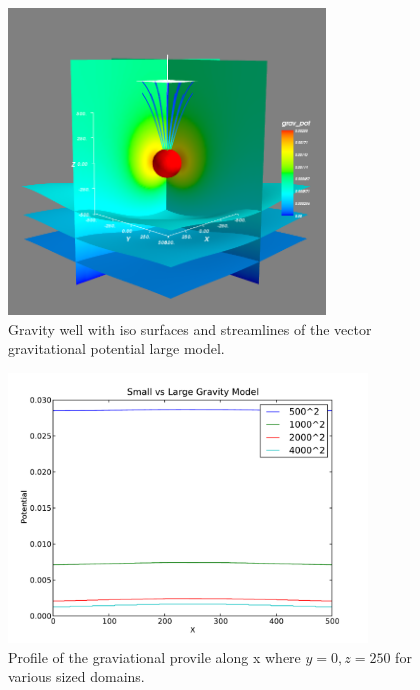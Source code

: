 \begin{figure}[htp]
\centering
\includegraphics[width=0.75\textwidth]{figures/ex10bpot2.png}
\caption{Gravity well with iso surfaces and streamlines of the vector
gravitational potential \textemdash large model.}
\label{fig:ex10bpot2}
\end{figure}

\begin{figure}[htp]
\centering
\includegraphics[width=0.85\textwidth]{figures/ex10p_boundeff.pdf}
\caption{Profile of the graviational provile along x where $y=0,z=250$ for
various sized domains.}
\label{fig:ex10p}
\end{figure}
\clearpage

